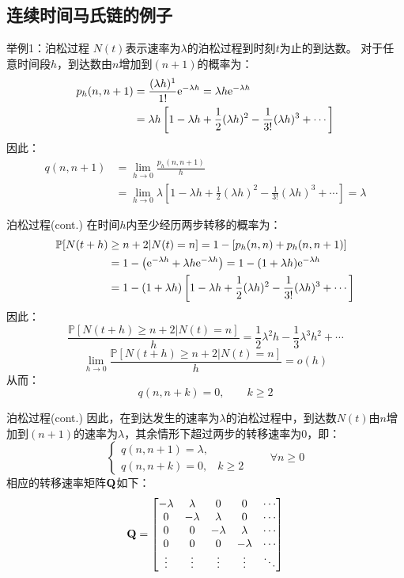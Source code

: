 \documentclass[t]{beamer}
\renewcommand{\Pr}{\mathbb{P}}
\begin{document}
\subsection{连续时间马氏链的例子}
\begin{frame}{举例1：泊松过程}
  $N(t)$表示速率为$\lambda$的泊松过程到时刻$t$为止的到达数。 
  对于任意时间段$h$，到达数由$n$增加到$(n+1)$的概率为：
  \[\begin{split}
  p_h(n,n+1)&=\frac{(\lambda h)^1}{1!}{\rm e}^{-\lambda h}=\lambda h {\rm e}^{-\lambda h}\\
  &=\lambda h \left[1-\lambda h+\frac{1}{2}(\lambda h)^2-\frac{1}{3!}(\lambda h)^3+\cdots \right]
  \end{split} \]
  因此：
  \[\begin{split}
  q(n,n+1)&=\lim_{h\to 0}\frac{p_h(n,n+1)}{h}\\
  &=\lim_{h\to 0}\lambda \left[1-\lambda h+\frac{1}{2}(\lambda h)^2-\frac{1}{3!}(\lambda h)^3+\cdots \right]=\lambda
  \end{split} \]
  
\end{frame}


\begin{frame}{泊松过程(cont.)}
  在时间$h$内至少经历两步转移的概率为：
  \[\begin{split}
  \Pr[N(t+h)&\ge n+2|N(t)=n]= 1-[p_h(n,n)+p_h(n,n+1)]
  \\&=1-\left( {\rm e}^{-\lambda h}+\lambda h{\rm e}^{-\lambda h}\right)=1-(1+\lambda h){\rm e}^{-\lambda h}  \\
  &=1-(1+\lambda h)\left[1-\lambda h+\frac{1}{2}(\lambda h)^2-\frac{1}{3!}(\lambda h)^3+\cdots  \right]\\
  \end{split} \]
  因此：
\[\frac{\Pr[N(t+h)\ge n+2|N(t)=n]}{h}=\frac{1}{2}\lambda^2 h-\frac{1}{3}\lambda^3 h^2+\cdots \]
\[\lim_{h\to 0}\frac{\Pr[N(t+h)\ge n+2|N(t)=n]}{h}=o(h) \]
从而：$$q(n,n+k)=0,\qquad k\ge 2$$
\end{frame}

\begin{frame}{泊松过程(cont.)}
  因此，在到达发生的速率为$\lambda$的泊松过程中，到达数$N(t)$由$n$增加到$(n+1)$的速率为$\lambda$，其余情形下超过两步的转移速率为0，即：
  \begin{equation*}
  \begin{cases}
  q(n,n+1)=\lambda,\\
  q(n,n+k)=0, & k\ge 2
  \end{cases}\qquad  \forall n\ge0
  \end{equation*}
  相应的转移速率矩阵${\bf Q}$如下：
  \[{\bf Q}=\begin{bmatrix}
  -\lambda & \lambda & 0& 0& \cdots \\
  0& -\lambda & \lambda&0& \cdots\\
  0&0& -\lambda &\lambda& \cdots \\
  0&0& 0 &-\lambda& \cdots \\
  \vdots & \vdots &\vdots &\vdots&\ddots \\
  \end{bmatrix} \]
\end{frame}
\end{document}
